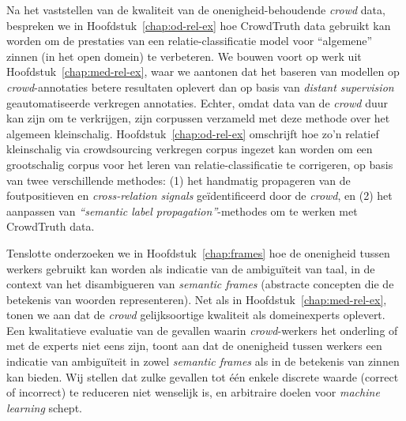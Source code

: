 Na het vaststellen van de kwaliteit van de onenigheid-behoudende \emph{crowd} data, bespreken we in Hoofdstuk~\ref{chap:od-rel-ex} hoe CrowdTruth data gebruikt kan worden om de prestaties van een relatie-classificatie model voor ``algemene'' zinnen (in het open domein) te verbeteren. 
We bouwen voort op werk uit Hoofdstuk~\ref{chap:med-rel-ex}, waar we aantonen dat het baseren van modellen op \emph{crowd}-annotaties betere resultaten oplevert dan op basis van \emph{distant supervision} geautomatiseerde verkregen annotaties. 
Echter, omdat data van de \emph{crowd} duur kan zijn om te verkrijgen, zijn corpussen verzameld met deze methode over het algemeen kleinschalig. 
Hoofdstuk~\ref{chap:od-rel-ex} omschrijft hoe zo’n relatief kleinschalig via crowdsourcing verkregen corpus ingezet kan worden om een grootschalig corpus voor het leren van relatie-classificatie te corrigeren, op basis van twee verschillende methodes: 
(1) het handmatig propageren van de foutpositieven en \emph{cross-relation signals} geïdentificeerd door de \emph{crowd}, en 
(2) het aanpassen van \emph{“semantic label propagation”}-methodes om te werken met CrowdTruth data. 

Tenslotte onderzoeken we in Hoofdstuk~\ref{chap:frames} hoe de onenigheid tussen werkers gebruikt kan worden als indicatie van de ambiguïteit van taal, in de context van het disambigueren van \emph{semantic frames} (abstracte concepten die de betekenis van woorden representeren). 
Net als in Hoofdstuk~\ref{chap:med-rel-ex}, tonen we aan dat de \emph{crowd} gelijksoortige kwaliteit als domeinexperts oplevert. 
Een kwalitatieve evaluatie van de gevallen waarin \emph{crowd}-werkers het onderling of met de experts niet eens zijn, toont aan dat de onenigheid tussen werkers een indicatie van ambiguïteit in zowel \emph{semantic frames} als in de betekenis van zinnen kan bieden. 
Wij stellen dat zulke gevallen tot één enkele discrete waarde (correct of incorrect) te reduceren niet wenselijk is, en arbitraire doelen voor \emph{machine learning} schept. 
